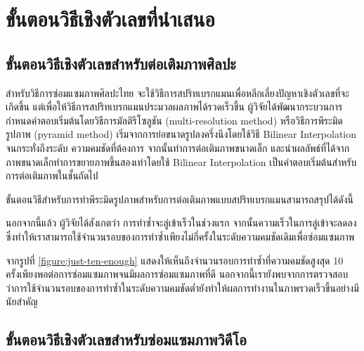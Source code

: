 \section{ขั้นตอนวิธีเชิงตัวเลขที่นำเสนอ}
\subsection{ขั้นตอนวิธีเชิงตัวเลขสำหรับต่อเติมภาพศิลปะ}

\hspace{1cm} สำหรับวิธีการซ่อมแซมภาพศิลปะไทย จะใช้วิธีการสปริทเบรกแมนเพื่อหลีกเลี่ยงปัญหาเชิงตัวเลขที่จะเกิดขึ้น แต่เพื่อให้วิธีการสปริทเบรกแมนประมวลผลภาพได้รวดเร็วขึ้น ผู้วิจัยได้พัฒนากระบวนการกำหนดคำตอบเริ่มต้นโดยวิธีการมัลติรีโซลูชัน (multi-resolution method) หรือวิธีการพีระมิดรูปภาพ (pyramid method) \cite{ref:image-pyramid}
เริ่มจากการย่อขนาดรูปลงครึ่งนึงโดยใช้วิธี Bilinear Interpolation จนกระทั่งถึงระดับ \break ความคมชัดที่ต้องการ จากนั้นทำการต่อเติมภาพขนาดเล็ก และนำผลลัพธ์ที่ได้จากภาพขนาดเล็กทำการขยายภาพขึ้นสองเท่าโดยใช้ Bilinear Interpolation เป็นคำตอบเริ่มต้นสำหรับการต่อเติมภาพในชั้นถัดไป

\clearpage
\hspace{1cm} ขั้นตอนวิธีสำหรับการทำพีระมิดรูปภาพสำหรับการต่อเติมภาพแบบสปริทเบรกแมนสามารถสรุปได้ดังนี้


\vspace{0.5cm}



\vspace{0.5cm}

\hspace{1cm} นอกจากนี้แล้ว ผู้วิจัยได้สังเกตว่า การทำซ้ำจะลู่เข้าเร็วในช่วงแรก จากนั้นความเร็วในการลู่เข้าจะลดลง ซึ่งทำให้เราสามารถใช้จำนวนรอบของการทำซ้ำเพียงไม่กี่ครั้งในระดับความคมชัดเดิมเพื่อซ่อมแซมภาพ



\hspace{1cm} 
จากรูปที่ \ref{figure:just-ten-enough}
แสดงให้เห็นถึงจำนวนรอบการทำซ้ำที่ความคมชัดสูงสุด 10 ครั้งเพียงพอต่อการซ่อมแซมภาพจนมีผลการซ่อมแซมภาพที่ดี นอกจากนี้เรายังพบจากการตรวจสอบว่าการใช้จำนวนรอบของการทำซ้ำในระดับความคมชัดต่ำยังทำให้ผลการทำงานในภาพรวดเร็วขึ้นอย่างมีนัยสำคัญ

\subsection{ขั้นตอนวิธีเชิงตัวเลขสำหรับซ่อมแซมภาพวิดีโอ}

